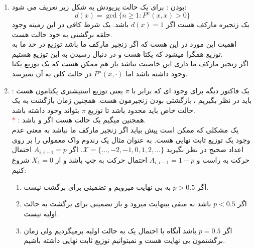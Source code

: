 \begin{enumerate}
\begin{latin}
\begin{figure}[!ht]
\label{fig:my_label}
\end{figure}
\end{latin}
اگر از حالت ۴ شروع کنیم همیشه در این حالت میمونیم. پس یک توزیع استیشنری میتواند $\mathbf{\pi}=(0,0,0,1)$ باشد. همچنین اگر از یکی از دو حالت ۱ و ۲ شروع کنیم بین این دو نوسان میکنیم. پس یک توزیع استیشنری دیگر نیز میتواند $\mathbf{\pi} = (0.5,0.5,0,0)$ باشد. اگر هم از حالت ۳ شروع کنیم ممکن است به هر کدام از دو توزیع بالا برسیم.\\
برای جلوگیری از این مشکل ، یعنی غیر یکتا بودن توزیع نهایی یا همون () زنجیره مارکف ما باید غیرکاهشی باشد ، یعنی بتوان از هر حالت به هر حالت دیگری رسید.
\item {} بودن : برای یک حالت پریودش به شکل زیر تعریف می شود:
\begin{equation*}
    d(x) = \gcd\{n\geq1:P^n(x,x)>0 \}
\end{equation*}
یک زنجیره مارکف  هست اگر $d(x) = 1$ باشد. یک شرط کافی در این زمینه وجود حلقه برگشتی به خود حالت هست. \\
اهمیت این مورد در این هست که اگر زنجیر مارکف ما  باشد توزیع در حد ما به توزیع  همگرا میشود که یکتا هست و در  دنبال رسیدن به این توزیع هستیم.\\
اگر زنجیر مارکف ما داری این خاصیت نباشد باز هم ممکن هست که یک توزیع  یکتا وجود داشته باشد اما $P^n(x,\cdot)$ در حالت کلی به آن نمیرسد.
\item {} : یک فاکتور دیگه برای وجود  ای که برابر با $\pi$ یعنی توزیع استیشنری یکتامون هست باید در نظر بگیریم ، بازگشتی بودن زنجیرمون هست. همچنین زمان بازگشت به یک حالت خاص باید محدود باشد تا توزیع $\pi$ بتواند وجود داشته باشد.\\
\textcolor{red}{*} : همجنین میگیم یک حالت  هست اگر  و  باشد.\\
یک مشکلی که ممکن است پیش بیاید اگر زنجیر مارکف ما  نباشد  به معنی عدم وجود یک توزیع ثابت نهایی هست. به عنوان مثال یک رندوم واک معمولی را بر روی اعداد صحیح در نظر بگیرید $\mathcal{X} = \{\ldots ,-2,-1,0,1,2,\ldots\}$. اگر $A_{i,i+1} = p$ احتمال حرکت به راست و $A_{i,i-1} = 1-p$ احتمال حرکت به چپ باشد و از $X_1=0$ شروع کنیم:
\begin{enumerate}
    \item اگر $p>0.5$ به بی نهایت میرویم و تضمینی برای برگشت نیست.
    \item اگر $p<0.5$ باشد به منفی بینهایت میرود و باز تضمینی برای برگشت به حالت اولیه نیست.
    \item اگر $p=0.5$ باشد آنگاه با احتمال یک به حالت اولیه برمیگردیم ولی زمان برگشتمون بی نهایت هست و نمیتوانیم توزیع ثابت نهایی داشته باشیم.
\end{enumerate}
\end{enumerate}

